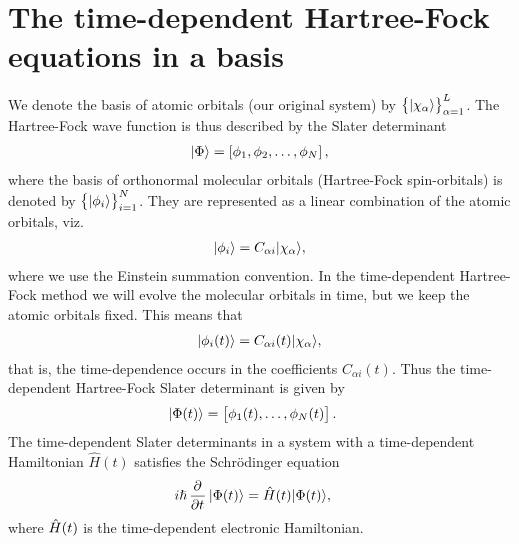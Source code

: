 \section{The time-dependent Hartree-Fock equations in a basis}
    We denote the basis of atomic orbitals (our original system) by
    $\left\{ | \chi_\alpha \rangle \right\}_{\alpha = 1}^L$. The Hartree-Fock wave function is
    thus described by the Slater determinant
    \begin{align}
        | \Phi \rangle = \left[ \phi_1, \phi_2, \dots, \phi_N \right],
    \end{align}
    where the basis of orthonormal molecular orbitals (Hartree-Fock
    spin-orbitals) is denoted by $\left\{ | \phi_i \rangle \right\}_{i = 1}^N$. They are
    represented as a linear combination of the atomic orbitals, viz.
    \begin{align}
        | \phi_i \rangle = C_{\alpha i}| \chi_{\alpha} \rangle,
    \end{align}
    where we use the Einstein summation convention. In the time-dependent
    Hartree-Fock method we will evolve the molecular orbitals in time, but we
    keep the atomic orbitals fixed. This means that
    \begin{align}
        | \phi_i(t) \rangle = C_{\alpha i}(t)| \chi_{\alpha} \rangle,
    \end{align}
    that is, the time-dependence occurs in the coefficients $C_{\alpha i}(t)$.
    Thus the time-dependent Hartree-Fock Slater determinant is given by
    \begin{align}
        | \Phi(t) \rangle
        &=
        \left[ 
            \phi_1(t), \dots, \phi_N(t)
         \right].
    \end{align}
    The time-dependent Slater determinants in a system with a time-dependent
    Hamiltonian $\hat{H}(t)$ satisfies the Schrödinger equation
    \begin{align}
        i\hslash\dpd[]{}{t}\ket{\Phi(t)}
        &= \hamil(t)\ket{\Phi(t)},
    \end{align}
    where $\hat{H}(t)$ is the time-dependent electronic Hamiltonian.

